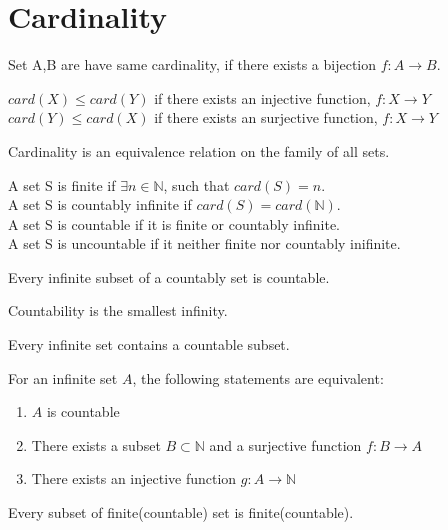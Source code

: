 \section{Cardinality}
	\begin{definition}
		Set A,B are have same cardinality, if there exists a bijection $f:A \to B$.
	\end{definition}
	\begin{remark}
		$card(X) \le card(Y)$ if there exists an injective function, $f:X \to Y$\\
		$card(Y) \le card(X)$ if there exists an surjective function, $f:X \to Y$
	\end{remark}
	\begin{remark}
		Cardinality is an equivalence relation on the family of all sets.
	\end{remark}
	\begin{definition}
		A set S is finite if $\exists n \in \mathbb{N}$, such that $card(S) = n$.\\
		A set S is countably infinite if $card(S) = card(\mathbb{N})$.\\
		A set S is countable if it is finite or countably infinite.\\
		A set S is uncountable if it neither finite nor countably inifinite.
	\end{definition}
	\begin{theorem}
		Every infinite subset of a countably set is countable.
	\end{theorem}
	\begin{remark}
		Countability is the smallest infinity.
	\end{remark}
	\begin{theorem}
		Every infinite set contains a countable subset.
	\end{theorem}
	\begin{theorem}
		For an infinite set $A$, the following statements are equivalent:\cite{alip1}
		\begin{enumerate}
			\item $A$ is countable
			\item There exists a subset $B\subset\mathbb{N}$ and a surjective function $f:B\to A$
			\item There exists an injective function $g:A\to \mathbb{N}$
		\end{enumerate}
	\end{theorem}
	\begin{theorem}
		Every subset of finite(countable) set is finite(countable).
	\end{theorem}
